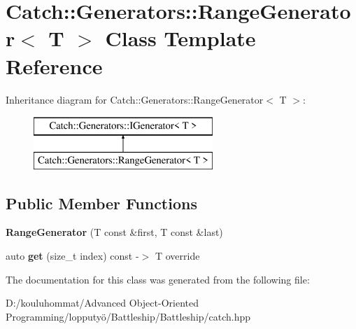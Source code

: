 \hypertarget{class_catch_1_1_generators_1_1_range_generator}{}\section{Catch\+:\+:Generators\+:\+:Range\+Generator$<$ T $>$ Class Template Reference}
\label{class_catch_1_1_generators_1_1_range_generator}
Inheritance diagram for Catch\+:\+:Generators\+:\+:Range\+Generator$<$ T $>$\+:\begin{figure}[H]
\begin{center}
\leavevmode
\includegraphics[height=2.000000cm]{class_catch_1_1_generators_1_1_range_generator}
\end{center}
\end{figure}
\subsection*{Public Member Functions}
\begin{DoxyCompactItemize}
\item 
\mbox{\label{class_catch_1_1_generators_1_1_range_generator_a56c5fcc855bdb668d7b93c2017a7c44c}} 
{\bfseries Range\+Generator} (T const \&first, T const \&last)
\item 
\mbox{\label{class_catch_1_1_generators_1_1_range_generator_a78f7f624b7545823d1a683ebf2ac00e7}} 
auto {\bfseries get} (size\+\_\+t index) const -\/$>$ T override
\end{DoxyCompactItemize}


The documentation for this class was generated from the following file\+:\begin{DoxyCompactItemize}
\item 
D\+:/kouluhommat/\+Advanced Object-\/\+Oriented Programming/lopputyö/\+Battleship/\+Battleship/catch.\+hpp\end{DoxyCompactItemize}
